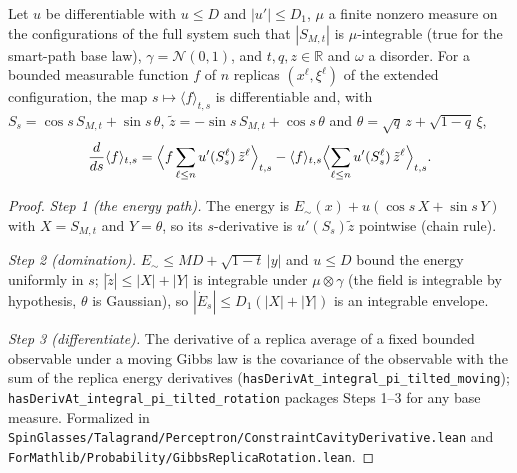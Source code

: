 \begin{proposition}\label{prop:sg-tal:perceptron-cavity-pathwise-derivative}
  \leanok
Let $u$ be differentiable with $u\le D$ and $|u'|\le D_1$, $\mu$ a finite nonzero measure on the configurations of the full system such that
$|S_{M,t}|$ is $\mu$-integrable (true for the smart-path base law), $\gamma=\mathcal N(0,1)$, and $t,q,z\in\mathbb R$ and $\omega$ a disorder. For a bounded
measurable function $f$ of $n$ replicas $(x^\ell,\xi^\ell)$ of the extended configuration, the map $s\mapsto\langle f\rangle_{t,s}$ is differentiable and, with
$S_s=\cos s\,S_{M,t}+\sin s\,\theta$, $\tilde z=-\sin s\,S_{M,t}+\cos s\,\theta$ and $\theta=\sqrt q\,z+\sqrt{1-q}\,\xi$,
\[
 \frac{d}{ds}\langle f\rangle_{t,s}=\Bigl\langle f\sum_{\ell\le n}u'(S_s^\ell)\,\tilde z^\ell\Bigr\rangle_{t,s}
 -\langle f\rangle_{t,s}\Bigl\langle\sum_{\ell\le n}u'(S_s^\ell)\,\tilde z^\ell\Bigr\rangle_{t,s}.
\]
\end{proposition}
\begin{proof}
  \leanok
\emph{Step 1 (the energy path).} The energy is $E_\sim(x)+u(\cos s\,X+\sin s\,Y)$ with $X=S_{M,t}$ and $Y=\theta$, so its $s$-derivative is $u'(S_s)\tilde z$ pointwise (chain rule).

\emph{Step 2 (domination).} $E_\sim\le M D+\sqrt{1-t}\,|y|$ and $u\le D$ bound the energy uniformly in $s$; $|\tilde z|\le|X|+|Y|$ is integrable under $\mu\otimes\gamma$ (the field is integrable by
hypothesis, $\theta$ is Gaussian), so $|\dot E_s|\le D_1(|X|+|Y|)$ is an integrable envelope.

\emph{Step 3 (differentiate).} The derivative of a replica average of a fixed bounded observable under a moving Gibbs law is the covariance of the observable with the sum of the replica
energy derivatives (\texttt{hasDerivAt\_integral\_pi\_tilted\_moving}); \texttt{hasDerivAt\_integral\_pi\_tilted\_rotation} packages Steps 1--3 for any base measure.
Formalized in \texttt{SpinGlasses/Talagrand/Perceptron/ConstraintCavityDerivative.lean} and \texttt{ForMathlib/Probability/GibbsReplicaRotation.lean}.
\end{proof}

